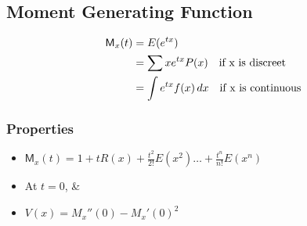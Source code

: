 \documentclass[./EngineeringMaths.tex]{subfiles}
\begin{document}
\subsection{Moment Generating Function}
\begin{align*}
\mathsf{M}_x(t) &= E(e^{tx}) \\
& = \displaystyle\sum xe^{tx}P(x) \text{\quad if x is discreet}\\
&= \displaystyle\int e^{tx}f(x)\,dx \text{\quad if x is continuous}\\
\end{align*}

\subsubsection*{Properties}
\begin{itemize}
\item $\mathsf{M}_x(t) = 1 + tR(x) + \frac{t^2}{2!}E(x^2)\dots+\frac{t^n}{n!}E(x^n)$
\item At $t=0$,  \& 
\item $V(x) = M_x''(0) - M_x'(0)^2$
\end{itemize}
\end{document}

